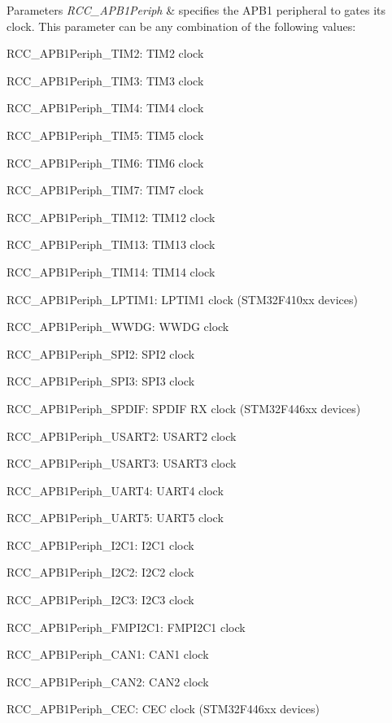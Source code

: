 \begin{DoxyParams}{Parameters}
{\em R\+C\+C\+\_\+\+A\+P\+B1\+Periph} & specifies the A\+P\+B1 peripheral to gates its clock. This parameter can be any combination of the following values\+: \begin{DoxyItemize}
\item R\+C\+C\+\_\+\+A\+P\+B1\+Periph\+\_\+\+T\+I\+M2\+: T\+I\+M2 clock \item R\+C\+C\+\_\+\+A\+P\+B1\+Periph\+\_\+\+T\+I\+M3\+: T\+I\+M3 clock \item R\+C\+C\+\_\+\+A\+P\+B1\+Periph\+\_\+\+T\+I\+M4\+: T\+I\+M4 clock \item R\+C\+C\+\_\+\+A\+P\+B1\+Periph\+\_\+\+T\+I\+M5\+: T\+I\+M5 clock \item R\+C\+C\+\_\+\+A\+P\+B1\+Periph\+\_\+\+T\+I\+M6\+: T\+I\+M6 clock \item R\+C\+C\+\_\+\+A\+P\+B1\+Periph\+\_\+\+T\+I\+M7\+: T\+I\+M7 clock \item R\+C\+C\+\_\+\+A\+P\+B1\+Periph\+\_\+\+T\+I\+M12\+: T\+I\+M12 clock \item R\+C\+C\+\_\+\+A\+P\+B1\+Periph\+\_\+\+T\+I\+M13\+: T\+I\+M13 clock \item R\+C\+C\+\_\+\+A\+P\+B1\+Periph\+\_\+\+T\+I\+M14\+: T\+I\+M14 clock \item R\+C\+C\+\_\+\+A\+P\+B1\+Periph\+\_\+\+L\+P\+T\+I\+M1\+: L\+P\+T\+I\+M1 clock (S\+T\+M32\+F410xx devices) \item R\+C\+C\+\_\+\+A\+P\+B1\+Periph\+\_\+\+W\+W\+DG\+: W\+W\+DG clock \item R\+C\+C\+\_\+\+A\+P\+B1\+Periph\+\_\+\+S\+P\+I2\+: S\+P\+I2 clock \item R\+C\+C\+\_\+\+A\+P\+B1\+Periph\+\_\+\+S\+P\+I3\+: S\+P\+I3 clock \item R\+C\+C\+\_\+\+A\+P\+B1\+Periph\+\_\+\+S\+P\+D\+IF\+: S\+P\+D\+IF RX clock (S\+T\+M32\+F446xx devices) \item R\+C\+C\+\_\+\+A\+P\+B1\+Periph\+\_\+\+U\+S\+A\+R\+T2\+: U\+S\+A\+R\+T2 clock \item R\+C\+C\+\_\+\+A\+P\+B1\+Periph\+\_\+\+U\+S\+A\+R\+T3\+: U\+S\+A\+R\+T3 clock \item R\+C\+C\+\_\+\+A\+P\+B1\+Periph\+\_\+\+U\+A\+R\+T4\+: U\+A\+R\+T4 clock \item R\+C\+C\+\_\+\+A\+P\+B1\+Periph\+\_\+\+U\+A\+R\+T5\+: U\+A\+R\+T5 clock \item R\+C\+C\+\_\+\+A\+P\+B1\+Periph\+\_\+\+I2\+C1\+: I2\+C1 clock \item R\+C\+C\+\_\+\+A\+P\+B1\+Periph\+\_\+\+I2\+C2\+: I2\+C2 clock \item R\+C\+C\+\_\+\+A\+P\+B1\+Periph\+\_\+\+I2\+C3\+: I2\+C3 clock \item R\+C\+C\+\_\+\+A\+P\+B1\+Periph\+\_\+\+F\+M\+P\+I2\+C1\+: F\+M\+P\+I2\+C1 clock \item R\+C\+C\+\_\+\+A\+P\+B1\+Periph\+\_\+\+C\+A\+N1\+: C\+A\+N1 clock \item R\+C\+C\+\_\+\+A\+P\+B1\+Periph\+\_\+\+C\+A\+N2\+: C\+A\+N2 clock \item R\+C\+C\+\_\+\+A\+P\+B1\+Periph\+\_\+\+C\+EC\+: C\+EC clock (S\+T\+M32\+F446xx devices) \item 
\end{DoxyItemize}
\end{DoxyParams}
